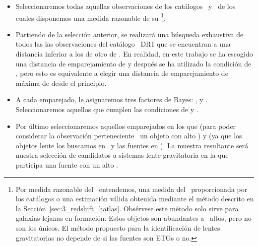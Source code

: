 \begin{itemize}
    
    \item Seleccionaremos todas aquellas observaciones de los catálogos \hatlas\ y \gama\ de los cuales disponemos una medida razonable de su \rt \footnote{Por medida razonable del \rt\ entendemos, una medida del \rt\ proporcionada por los catálogos o una estimación válida obtenida mediante el método descrito en la Sección~\ref{sec:3_redshift_hatlas}. Obsérvese este método solo sirve para galaxias lejanas en formación. Estos objetos son abundantes a \rts\ altos, pero no son los únicos. El método propuesto para la identificación de lentes gravitatorias no depende de si las fuentes son ETGs o no.}.
    
    \item Partiendo de la selección anterior, se realizará una búsqueda exhaustiva de todos las las observaciones del catálogo \hatlas\ DR1 que se encuentran a una distancia inferior a los  de otro de \gama. En realidad, en este trabajo se ha escogido una distancia de emparejamiento de  y después se ha utilizado la condición de , pero esto es equivalente a elegir una distancia de emparejamiento de máxima de  desde el principio.
    
    \item A cada emparejado, le asignaremos tres factores de Bayes: ,  y . Seleccionaremos aquellos que cumplen las condiciones de  y .
    
    \item Por último seleccionaremos aquellos emparejados en los que  (para poder considerar la observación perteneciente \hatlas\ un objeto con alto \rt ) y  (ya que los objetos lente los buscamos en \gama\ y las fuentes en \hatlas ). La muestra resultante será nuestra selección de candidatos a sistemas lente gravitatoria en la que participa una fuente con un alto \rt.
    
\end{itemize}